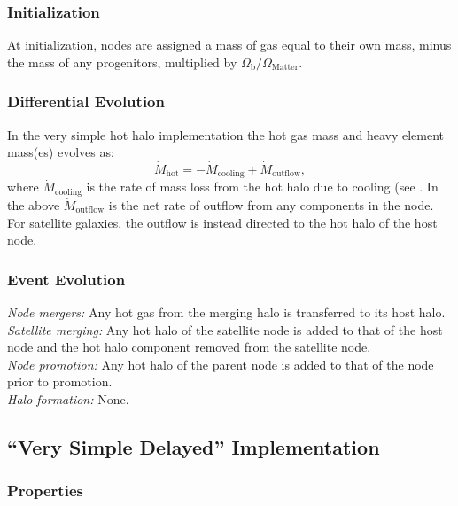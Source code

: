 \subsubsection{Initialization}

At initialization, nodes are assigned a mass of gas equal to their own mass, minus the mass of any progenitors, multiplied by $\Omega_\mathrm{b}/\Omega_\mathrm{Matter}$.

\subsubsection{Differential Evolution}

In the very simple hot halo implementation the hot gas mass and heavy element mass(es) evolves as:
\begin{equation}
 \dot{M}_\mathrm{hot} = - \dot{M}_\mathrm{cooling} + \dot{M}_\mathrm{outflow},
\end{equation}
where $\dot{M}_\mathrm{cooling}$ is the rate of mass loss from the hot halo due to cooling (see .
In the above $\dot{M}_\mathrm{outflow}$ is the net rate of outflow from any components in the node. For satellite galaxies, the outflow is instead directed to the hot halo of the host \gls{node}.

\subsubsection{Event Evolution}

\noindent\emph{Node mergers:} Any hot gas from the merging halo is transferred to its host halo.\\

\noindent\emph{Satellite merging:} Any hot halo of the satellite \gls{node} is added to that of the host \gls{node} and the hot halo \gls{component} removed from the satellite node.\\

\noindent\emph{Node promotion:} Any hot halo of the parent \gls{node} is added to that of the \gls{node} prior to promotion.\\

\noindent\emph{Halo formation:} None.\\

\subsection{``Very Simple Delayed'' Implementation}

\subsubsection{Properties}

